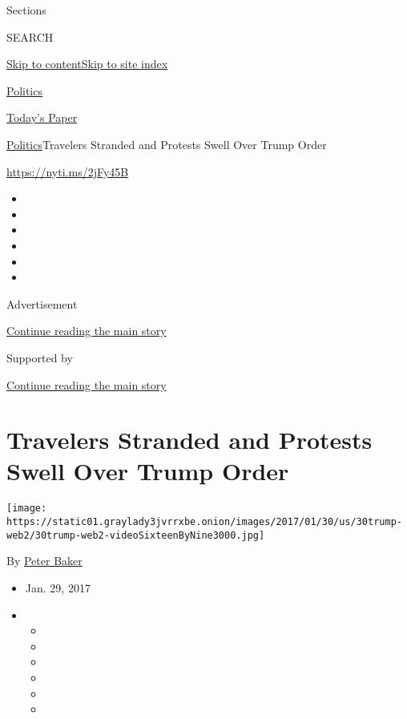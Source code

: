 Sections

SEARCH

\protect\hyperlink{site-content}{Skip to
content}\protect\hyperlink{site-index}{Skip to site index}

\href{https://www.nytimes3xbfgragh.onion/section/politics}{Politics}

\href{https://myaccount.nytimes3xbfgragh.onion/auth/login?response_type=cookie\&client_id=vi}{}

\href{https://www.nytimes3xbfgragh.onion/section/todayspaper}{Today's
Paper}

\href{/section/politics}{Politics}\textbar{}Travelers Stranded and
Protests Swell Over Trump Order

\url{https://nyti.ms/2jFy45B}

\begin{itemize}
\item
\item
\item
\item
\item
\item
\end{itemize}

Advertisement

\protect\hyperlink{after-top}{Continue reading the main story}

Supported by

\protect\hyperlink{after-sponsor}{Continue reading the main story}

\hypertarget{travelers-stranded-and-protests-swell-over-trump-order}{%
\section{Travelers Stranded and Protests Swell Over Trump
Order}\label{travelers-stranded-and-protests-swell-over-trump-order}}

\texttt{[image: https://static01.graylady3jvrrxbe.onion/images/2017/01/30/us/30trump-web2/30trump-web2-videoSixteenByNine3000.jpg]}

By \href{http://www.nytimes3xbfgragh.onion/by/peter-baker}{Peter Baker}

\begin{itemize}
\item
  Jan. 29, 2017
\item
  \begin{itemize}
  \item
  \item
  \item
  \item
  \item
  \item
  \end{itemize}
\end{itemize}

